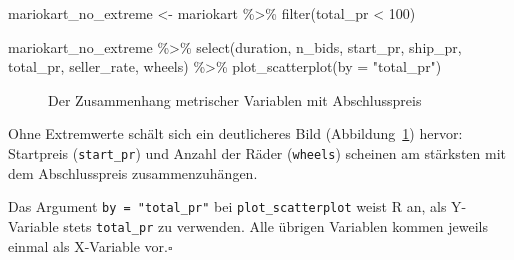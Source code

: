 \documentclass[
  letterpaper,
]{scrbook}
\newenvironment{Shaded}{\begin{snugshade}}{\end{snugshade}}
\newcommand{\AttributeTok}[1]{\textcolor[rgb]{0.40,0.45,0.13}{#1}}
\newcommand{\DecValTok}[1]{\textcolor[rgb]{0.68,0.00,0.00}{#1}}
\newcommand{\FunctionTok}[1]{\textcolor[rgb]{0.28,0.35,0.67}{#1}}
\newcommand{\NormalTok}[1]{\textcolor[rgb]{0.00,0.23,0.31}{#1}}
\newcommand{\OtherTok}[1]{\textcolor[rgb]{0.00,0.23,0.31}{#1}}
\newcommand{\SpecialCharTok}[1]{\textcolor[rgb]{0.37,0.37,0.37}{#1}}
\newcommand{\StringTok}[1]{\textcolor[rgb]{0.13,0.47,0.30}{#1}}
\theoremstyle{definition}
\theoremstyle{definition}
\theoremstyle{definition}
\theoremstyle{remark}
\begin{document}
\begin{Shaded}
\begin{Highlighting}[]
\NormalTok{mariokart\_no\_extreme }\OtherTok{\textless{}{-}}
\NormalTok{  mariokart }\SpecialCharTok{\%\textgreater{}\%} 
  \FunctionTok{filter}\NormalTok{(total\_pr }\SpecialCharTok{\textless{}} \DecValTok{100}\NormalTok{)}

\NormalTok{mariokart\_no\_extreme }\SpecialCharTok{\%\textgreater{}\%} 
  \FunctionTok{select}\NormalTok{(duration, n\_bids, start\_pr, }
\NormalTok{         ship\_pr, total\_pr, }
\NormalTok{         seller\_rate, wheels) }\SpecialCharTok{\%\textgreater{}\%} 
  \FunctionTok{plot\_scatterplot}\NormalTok{(}\AttributeTok{by =} \StringTok{"total\_pr"}\NormalTok{)}
\end{Highlighting}
\end{Shaded}

\begin{figure}[H]


\caption{\label{fig-mario-scatter2}Der Zusammenhang metrischer Variablen
mit Abschlusspreis}

\end{figure}%

Ohne Extremwerte schält sich ein deutlicheres Bild
(Abbildung~\ref{fig-mario-scatter2}) hervor: Startpreis
(\texttt{start\_pr}) und Anzahl der Räder (\texttt{wheels}) scheinen am
stärksten mit dem Abschlusspreis zusammenzuhängen.

Das Argument \texttt{by\ =\ "total\_pr"} bei \texttt{plot\_scatterplot}
weist R an, als Y-Variable stets \texttt{total\_pr} zu verwenden. Alle
übrigen Variablen kommen jeweils einmal als X-Variable vor.\(\square\)
\end{document}
